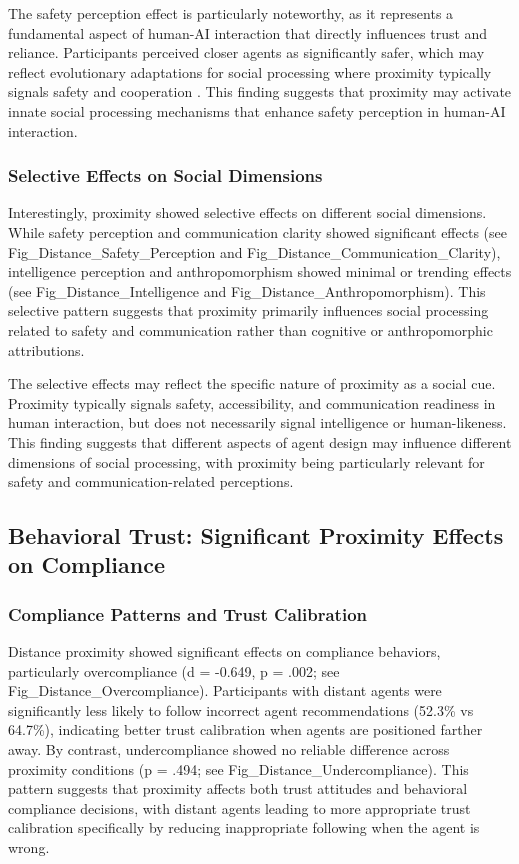 \documentclass[12pt]{article}
\begin{document}
The safety perception effect is particularly noteworthy, as it represents a fundamental aspect of human-AI interaction that directly influences trust and reliance. Participants perceived closer agents as significantly safer, which may reflect evolutionary adaptations for social processing where proximity typically signals safety and cooperation \citep{dunbar2010social}. This finding suggests that proximity may activate innate social processing mechanisms that enhance safety perception in human-AI interaction.


\subsubsection{Selective Effects on Social Dimensions}

Interestingly, proximity showed selective effects on different social dimensions. While safety perception and communication clarity showed significant effects (see Fig\_Distance\_Safety\_Perception and Fig\_Distance\_Communication\_Clarity), intelligence perception and anthropomorphism showed minimal or trending effects (see Fig\_Distance\_Intelligence and Fig\_Distance\_Anthropomorphism). This selective pattern suggests that proximity primarily influences social processing related to safety and communication rather than cognitive or anthropomorphic attributions.

The selective effects may reflect the specific nature of proximity as a social cue. Proximity typically signals safety, accessibility, and communication readiness in human interaction, but does not necessarily signal intelligence or human-likeness. This finding suggests that different aspects of agent design may influence different dimensions of social processing, with proximity being particularly relevant for safety and communication-related perceptions.

\subsection{Behavioral Trust: Significant Proximity Effects on Compliance}

\subsubsection{Compliance Patterns and Trust Calibration}

Distance proximity showed significant effects on compliance behaviors, particularly overcompliance (d = -0.649, p = .002; see Fig\_Distance\_Overcompliance). Participants with distant agents were significantly less likely to follow incorrect agent recommendations (52.3\% vs 64.7\%), indicating better trust calibration when agents are positioned farther away. By contrast, undercompliance showed no reliable difference across proximity conditions (p = .494; see Fig\_Distance\_Undercompliance). This pattern suggests that proximity affects both trust attitudes and behavioral compliance decisions, with distant agents leading to more appropriate trust calibration specifically by reducing inappropriate following when the agent is wrong.
\end{document}
